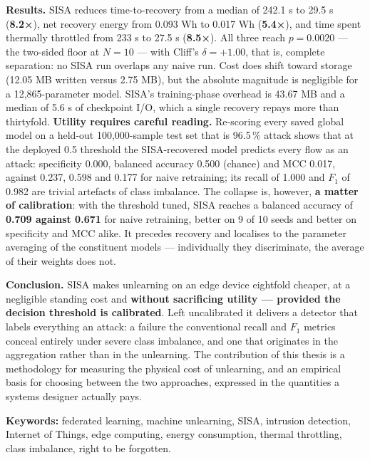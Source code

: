 \textbf{Results.} SISA reduces time-to-recovery from a median of 242.1 s to 29.5 s (\textbf{8.2×}), net
recovery energy from 0.093 Wh to 0.017 Wh (\textbf{5.4×}), and time spent thermally throttled from
233 s to 27.5 s (\textbf{8.5×}). All three reach $p = 0.0020$ --- the two-sided floor at $N = 10$ --- with Cliff's $\delta = +1.00$, that is, complete separation: no SISA run overlaps any naive
run. Cost does shift toward storage (12.05 MB written versus 2.75 MB), but the absolute
magnitude is negligible for a 12,865-parameter model. SISA's training-phase overhead is
43.67 MB and a median of 5.6 s of checkpoint I/O, which a single recovery repays more than
thirtyfold. \textbf{Utility requires careful reading.} Re-scoring every saved global model on a
held-out 100,000-sample test set that is 96.5\,\% attack shows that at the deployed 0.5
threshold the SISA-recovered model predicts every flow as an attack: specificity 0.000,
balanced accuracy 0.500 (chance) and MCC 0.017, against 0.237, 0.598 and 0.177 for naive
retraining; its recall of 1.000 and $F_1$ of 0.982 are trivial artefacts of class imbalance.
The collapse is, however, \textbf{a matter of calibration}: with the threshold tuned, SISA reaches
a balanced accuracy of \textbf{0.709 against 0.671} for naive retraining, better on 9 of 10 seeds
and better on specificity and MCC alike. It precedes recovery and localises to the parameter
averaging of the constituent models --- individually they discriminate, the average of their
weights does not.

\textbf{Conclusion.} SISA makes unlearning on an edge device eightfold cheaper, at a negligible
standing cost and \textbf{without sacrificing utility --- provided the decision threshold is
calibrated}. Left uncalibrated it delivers a detector that labels everything an attack: a
failure the conventional recall and $F_1$ metrics conceal entirely under severe class
imbalance, and one that originates in the aggregation rather than in the unlearning. The
contribution of this thesis is a methodology for measuring the physical cost of unlearning,
and an empirical basis for choosing between the two approaches, expressed in the quantities a
systems designer actually pays.

\textbf{Keywords:} federated learning, machine unlearning, SISA, intrusion detection, Internet of
Things, edge computing, energy consumption, thermal throttling, class imbalance, right to be
forgotten.

